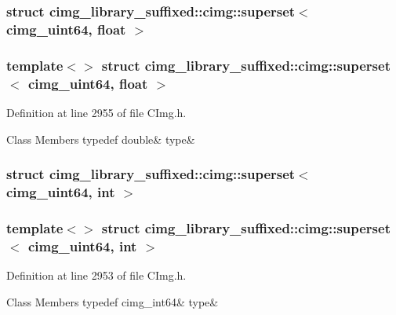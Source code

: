\subsubsection{struct cimg\+\_\+library\+\_\+suffixed\+:\+:cimg\+:\+:superset$<$ cimg\+\_\+uint64, float $>$}
\subsubsection*{template$<$$>$\newline
struct cimg\+\_\+library\+\_\+suffixed\+::cimg\+::superset$<$ cimg\+\_\+uint64, float $>$}



Definition at line 2955 of file C\+Img.\+h.

\begin{DoxyFields}{Class Members}
\mbox{\label{namespacecimg__library__suffixed_1_1cimg_a716714d140a416abe480e064606b4383}} 
typedef double&
type&
\\
\hline

\end{DoxyFields}
\label{structcimg__library__suffixed_1_1cimg_1_1superset_3_01cimg__uint64_00_01int_01_4}
\subsubsection{struct cimg\+\_\+library\+\_\+suffixed\+:\+:cimg\+:\+:superset$<$ cimg\+\_\+uint64, int $>$}
\subsubsection*{template$<$$>$\newline
struct cimg\+\_\+library\+\_\+suffixed\+::cimg\+::superset$<$ cimg\+\_\+uint64, int $>$}



Definition at line 2953 of file C\+Img.\+h.

\begin{DoxyFields}{Class Members}
\mbox{\label{namespacecimg__library__suffixed_1_1cimg_a2345cd4ea200853ee7725898c070c42e}} 
typedef cimg\_int64&
type&
\\
\hline

\end{DoxyFields}
\label{structcimg__library__suffixed_1_1cimg_1_1superset_3_01cimg__uint64_00_01short_01_4}
